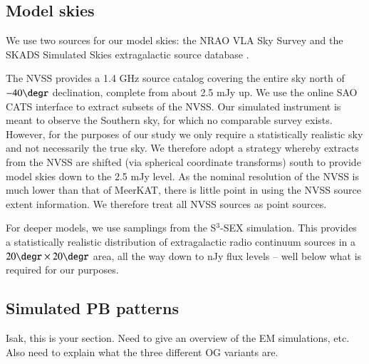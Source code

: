 \documentclass{aa}
\begin{document}

\subsection{Model skies}

We use two sources for our model skies: the NRAO VLA Sky Survey \citep[NVSS:][]{NVSS} and the SKADS Simulated Skies extragalactic source database \citep[S$^3$-SEX:][]{S3-SEX}. 

The NVSS provides a 1.4 GHz source catalog covering the entire sky north of $-40\degr$ declination, complete from about 2.5 mJy up. We use the online SAO CATS interface \citep{SAO-CATS} to extract subsets of the NVSS. Our simulated instrument is meant to observe the Southern sky, for which no comparable survey exists. However, for the purposes of our study we only require a statistically realistic sky and not necessarily the true sky. We therefore adopt a strategy whereby extracts from the NVSS are shifted (via spherical coordinate transforms) south to provide model skies down to the 2.5 mJy level. As the nominal resolution of the NVSS is much lower than that of MeerKAT, there is little point in using the NVSS source extent information. We therefore treat all NVSS sources as point sources. 

For deeper models, we use samplings from the S$^3$-SEX simulation. This provides a statistically realistic distribution of extragalactic radio continuum sources in a $20\degr\times20\degr$ area, all the way down to nJy flux levels -- well below what is required for our purposes.

\subsection{Simulated PB patterns}
\label{sec:emsims}

Isak, this is your section. Need to give an overview of the EM simulations, etc. Also need to explain what the three different OG variants are.
\end{document}
